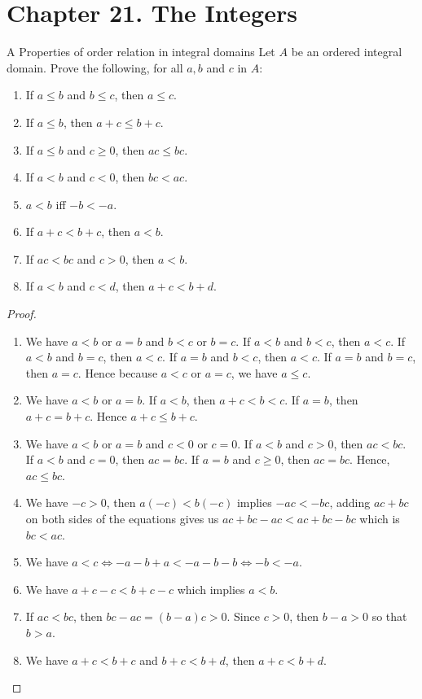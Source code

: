\section*{Chapter 21. The Integers}


\begin{exercise}{A Properties of order relation in integral domains}
Let $A$ be an ordered integral domain. Prove the following, for all $a,b$ and $c$ in $A$:
\begin{enumerate}
    \item If $a\leq b$ and $b\leq c$, then $a\leq c$.
    \item If $a\leq b$, then $a+c\leq b+c$.
    \item If $a\leq b$ and $c\geq 0$, then $ac\leq bc$.
    \item If $a<b$ and $c<0$, then $bc<ac$.
    \item $a<b$ iff $-b<-a$.
    \item If $a+c<b+c$, then $a<b$.
    \item If $ac<bc$ and $c>0$, then $a<b$.
    \item If $a<b$ and $c<d$, then $a+c<b+d$.
\end{enumerate}
\end{exercise}
\begin{proof}
 \begin{enumerate}
    \item We have $a<b$ or $a=b$ and $b<c$ or $b=c$. If $a<b$ and $b<c$, then $a<c$. If $a<b$ and $b=c$, then $a<c$. If $a=b$ and $b<c$, then $a<c$. If $a=b$ and $b=c$, then $a=c$. Hence because $a<c$ or $a=c$, we have $a\leq c$.
    \item We have $a<b$ or $a=b$. If $a<b$, then $a+c<b<c$. If $a=b$, then $a+c=b+c$. Hence $a+c\leq b+c$.
    \item We have $a<b$ or $a=b$ and $c<0$ or $c=0$. If $a<b$ and $c>0$, then $ac<bc$. If $a<b$ and $c=0$, then $ac=bc$. If $a=b$ and $c\geq 0$, then $ac=bc$. Hence, $ac\leq bc$.
    \item We have $-c>0$, then $a(-c)<b(-c)$ implies $-ac<-bc$, adding $ac+bc$ on both sides of the equations gives us $ac+bc-ac<ac+bc-bc$ which is $bc<ac$.
    \item We have $a<c\iff -a-b+a<-a-b-b\iff -b<-a$.
    \item We have $a+c-c<b+c-c$ which implies $a<b$.
    \item If $ac<bc$, then $bc-ac=(b-a)c>0$. Since $c>0$, then $b-a>0$ so that $b>a$.
    \item We have $a+c<b+c$ and $b+c<b+d$, then $a+c<b+d$.
\end{enumerate}
\end{proof}


